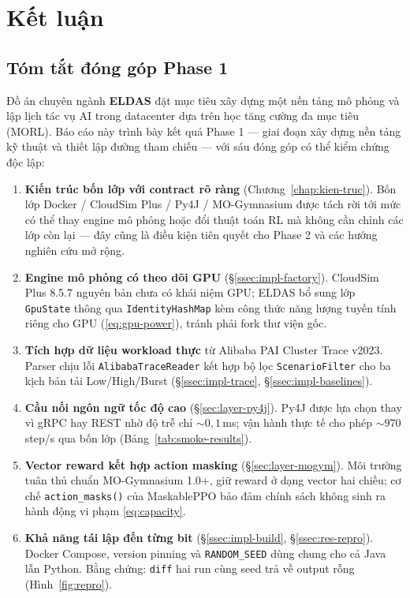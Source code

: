 \chapter{Kết luận}
\label{chap:ket-luan}

\section{Tóm tắt đóng góp Phase 1}
\label{sec:ket-luan-dong-gop}

Đồ án chuyên ngành \textbf{ELDAS} đặt mục tiêu xây dựng một nền tảng
mô phỏng và lập lịch tác vụ AI trong datacenter dựa trên học tăng
cường đa mục tiêu (MORL). Báo cáo này trình bày kết quả Phase 1 ---
giai đoạn xây dựng nền tảng kỹ thuật và thiết lập đường tham
chiếu --- với sáu đóng góp có thể kiểm chứng độc lập:

\begin{enumerate}
  \item \textbf{Kiến trúc bốn lớp với contract rõ ràng}
        (Chương~\ref{chap:kien-truc}). Bốn lớp Docker / CloudSim
        Plus / Py4J / MO-Gymnasium được tách rời tới mức có thể
        thay engine mô phỏng hoặc đổi thuật toán RL mà không cần
        chỉnh các lớp còn lại --- đây cũng là điều kiện tiên quyết
        cho Phase 2 và các hướng nghiên cứu mở rộng.
  \item \textbf{Engine mô phỏng có theo dõi GPU}
        (§\ref{ssec:impl-factory}). CloudSim Plus 8.5.7 nguyên bản
        chưa có khái niệm GPU; ELDAS bổ sung lớp \texttt{GpuState}
        thông qua \texttt{IdentityHashMap} kèm công thức năng lượng
        tuyến tính riêng cho GPU (\eqref{eq:gpu-power}), tránh phải
        fork thư viện gốc.
  \item \textbf{Tích hợp dữ liệu workload thực} từ Alibaba PAI
        Cluster Trace v2023. Parser chịu lỗi
        \texttt{AlibabaTraceReader} kết hợp bộ lọc
        \texttt{ScenarioFilter} cho ba kịch bản tải Low/High/Burst
        (§\ref{ssec:impl-trace}, §\ref{ssec:impl-baselines}).
  \item \textbf{Cầu nối ngôn ngữ tốc độ cao}
        (§\ref{sec:layer-py4j}). Py4J được lựa chọn thay vì gRPC
        hay REST nhờ độ trễ chỉ $\sim 0{,}1$\,ms; vận hành thực tế
        cho phép $\sim 970$ step/s qua bốn lớp
        (Bảng~\ref{tab:smoke-results}).
  \item \textbf{Vector reward kết hợp action masking}
        (§\ref{sec:layer-mogym}). Môi trường tuân thủ chuẩn
        MO-Gymnasium 1.0+, giữ reward ở dạng vector hai chiều; cơ
        chế \texttt{action\_masks()} của MaskablePPO bảo đảm chính
        sách không sinh ra hành động vi phạm \eqref{eq:capacity}.
  \item \textbf{Khả năng tái lập đến từng bit}
        (§\ref{ssec:impl-build}, §\ref{ssec:res-repro}). Docker
        Compose, version pinning và \texttt{RANDOM\_SEED} dùng
        chung cho cả Java lẫn Python. Bằng chứng: \texttt{diff}
        hai run cùng seed trả về output rỗng (Hình~\ref{fig:repro}).
\end{enumerate}

